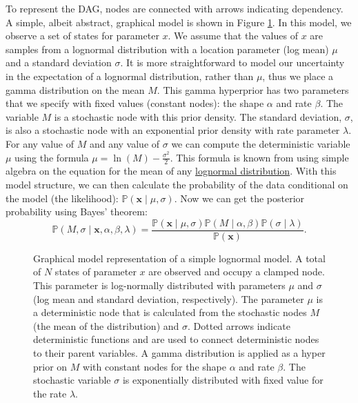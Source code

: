 \documentclass[11pt]{article}
\begin{document}
To represent the DAG, nodes are connected with arrows indicating dependency. 
A simple, albeit abstract, graphical model is shown in Figure \ref{simpleGM}. 
In this model, we observe a set of states for parameter $x$. 
We assume that the values of $x$ are samples from a lognormal distribution with a location parameter (log mean) $\mu$ and a standard deviation $\sigma$. 
It is more straightforward to model our uncertainty in the expectation of a lognormal distribution, rather than $\mu$, thus we place a gamma distribution on the mean $M$. 
This gamma hyperprior has two parameters that we specify with fixed values (constant nodes): the shape $\alpha$ and rate $\beta$. 
The variable $M$ is a stochastic node with this prior density.
The standard deviation, $\sigma$, is also a stochastic node with an exponential prior density with rate parameter $\lambda$.
For any value of $M$ and any value of $\sigma$ we can compute the deterministic variable $\mu$ using the formula $\mu = \ln(M) - \frac{\sigma^2}{2}$. 
This formula is known from using simple algebra on the equation for the mean of any \href{http://en.wikipedia.org/wiki/Log-normal_distribution}{lognormal distribution}.
With this model structure, we can then calculate the probability of the data conditional on the model (the likelihood): 
$\mathbb{P}(\boldsymbol{x} \mid \mu, \sigma)$. Now we can get the posterior probability using Bayes' theorem:
$$\mathbb{P}(M,\sigma \mid \boldsymbol{x}, \alpha, \beta, \lambda) = \frac{\mathbb{P}(\boldsymbol{x} \mid \mu, \sigma) \mathbb{P}(M \mid \alpha,\beta) \mathbb{P}(\sigma \mid \lambda)}{\mathbb{P}(\boldsymbol{x})}.$$
\begin{figure}[h!]
\centering
{}
\caption{\small Graphical model representation of a simple lognormal model. A total of $N$ states of parameter $x$ are observed and occupy a clamped node. 
This parameter is log-normally distributed with parameters $\mu$ and $\sigma$ (log mean and standard deviation, respectively). 
The parameter $\mu$ is a deterministic node that is calculated from the stochastic nodes $M$ (the mean of the distribution) and $\sigma$. 
Dotted arrows indicate deterministic functions and are used to connect deterministic nodes to their parent variables. 
A gamma distribution is applied as a hyper prior on $M$ with constant nodes for the shape $\alpha$ and rate $\beta$. 
The stochastic variable $\sigma$ is exponentially distributed with fixed value for the rate $\lambda$.
}
\label{simpleGM}
\end{figure}
\end{document}
